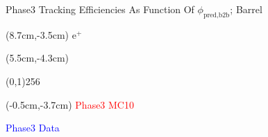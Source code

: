 \documentclass[8pt]{beamer}
\begin{document}
\begin{frame}{Phase3 Tracking Efficiencies As Function Of $\phi_{\textrm{pred,b2b}}$; Barrel}
	\begin{textblock*}{2cm}(8.7cm,-3.5cm)
		$\textrm{e}^+$
	\end{textblock*}
	
	
	
	\begin{textblock*}{11cm}(5.5cm,-4.3cm)
		
		\begin{center}
			\line(0,1){256}
		\end{center}
		
	\end{textblock*}
	
	
	
	\begin{textblock*}{4cm}(-0.5cm,-3.7cm)
		\textcolor{red}{Phase3 MC10}
		
		\textcolor{blue}{Phase3 Data}
	\end{textblock*}
	
	
	
	
\end{frame}
\end{document}
